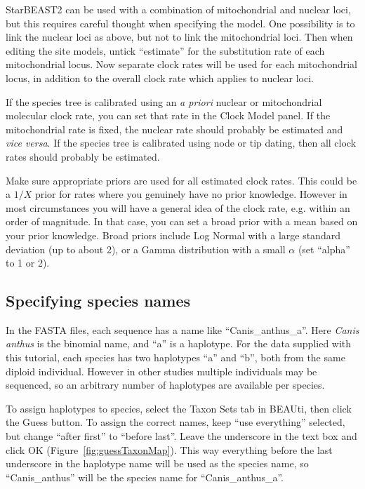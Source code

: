\documentclass[12pt]{article}
\begin{document}
\begin{tcolorbox}[colback=green!5,colframe=green!40!black,title=Mixing nuclear and mitochondrial loci]
StarBEAST2 can be used with a combination of mitochondrial and nuclear loci, but this requires careful thought when specifying the model. One possibility is to link the nuclear loci as above, but not to link the mitochondrial loci. Then when editing the site models, untick ``estimate'' for the substitution rate of each mitochondrial locus. Now separate clock rates will be used for each mitochondrial locus, in addition to the overall clock rate which applies to nuclear loci.

If the species tree is calibrated using an \textit{a priori} nuclear or mitochondrial molecular clock rate, you can set that rate in the Clock Model panel. If the mitochondrial rate is fixed, the nuclear rate should probably be estimated and \textit{vice versa}. If the species tree is calibrated using node or tip dating, then all clock rates should probably be estimated.

Make sure appropriate priors are used for all estimated clock rates. This could be a $1/X$ prior for rates where you genuinely have no prior knowledge. However in most circumstances you will have a general idea of the clock rate, e.g. within an order of magnitude. In that case, you can set a broad prior with a mean based on your prior knowledge. Broad priors include Log Normal with a large standard deviation (up to about 2), or a Gamma distribution with a small $\alpha$ (set ``alpha'' to 1 or 2).
\end{tcolorbox}

\subsection{Specifying species names}
\label{subsec:speciesNames}

In the FASTA files, each sequence has a name like ``Canis\_anthus\_a''.
Here \textit{Canis anthus} is the binomial name, and ``a'' is a haplotype.
For the data supplied with this tutorial, each species has two haplotypes ``a'' and ``b'', both from
the same diploid individual. However in other studies multiple individuals may
be sequenced, so an arbitrary number of haplotypes are available per species.

To assign haplotypes to species, select the Taxon Sets tab in BEAUti, then
click the Guess button. To assign the correct names, keep ``use everything''
selected, but change ``after first'' to ``before last''. Leave the underscore
in the text box and click OK (Figure~\ref{fig:guessTaxonMap}). This way everything before
the last underscore in the haplotype name will be used as the species name,
so ``Canis\_anthus'' will be the species name for ``Canis\_anthus\_a''.
\end{document}
